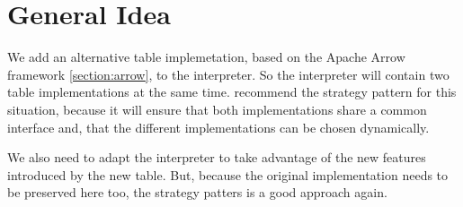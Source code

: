 %
%
%
%
%
%
%
%

\section{General Idea}
\label{section:General Idea}
We add an alternative table implemetation, based on the Apache Arrow framework \ref{section:arrow}, to the interpreter.
So the interpreter will contain two table implementations at the same time.
\textcite{Dooley2024} recommend the strategy pattern for this situation, because it will ensure that both implementations share a common interface and, that the different implementations can be chosen dynamically.

We also need to adapt the interpreter to take advantage of the new features introduced by the new table.
But, because the original implementation needs to be preserved here too, the strategy patters is a good approach again.

